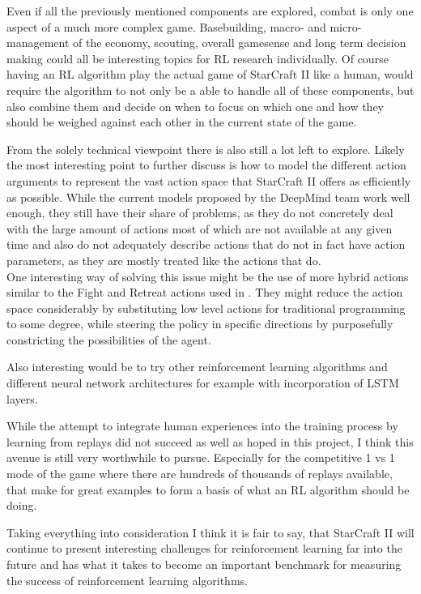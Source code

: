 Even if all the previously mentioned components are explored, combat is only one aspect of a much more complex game. Basebuilding, macro- and micro-management of the economy, scouting, overall gamesense and long term decision making could all be interesting topics for RL research individually. Of course having an RL algorithm play the actual game of StarCraft II like a human, would require the algorithm to not only be a able to handle all of these components, but also combine them and decide on when to focus on which one and how they should be weighed against each other in the current state of the game.

From the solely technical viewpoint there is also still a lot left to explore. Likely the most interesting point to further discuss is how to model the different action arguments to represent the vast action space that StarCraft II offers as efficiently as possible. While the current models proposed by the DeepMind team work well enough, they still have their share of problems, as they do not concretely deal with the large amount of actions most of which are not available at any given time and also do not adequately describe actions that do not in fact have action parameters, as they are mostly treated like the actions that do. \\ One interesting way of solving this issue might be the use of more hybrid actions similar to the Fight and Retreat actions used in \citep{broodwarRL}. They might reduce the action space considerably by substituting low level actions for traditional programming to some degree, while steering the policy in specific directions by purposefully constricting the possibilities of the agent. 

Also interesting would be to try other reinforcement learning algorithms and different neural network architectures for example with incorporation of LSTM layers.

While the attempt to integrate human experiences into the training process by learning from replays did not succeed as well as hoped in this project, I think this avenue is still very worthwhile to pursue. Especially for the competitive 1 vs 1 mode of the game where there are hundreds of thousands of replays available, that make for great examples to form a basis of what an RL algorithm should be doing. 

Taking everything into consideration I think it is fair to say, that StarCraft II will continue to present interesting challenges for reinforcement learning far into the future and has what it takes to become an important benchmark for measuring the success of reinforcement learning algorithms.